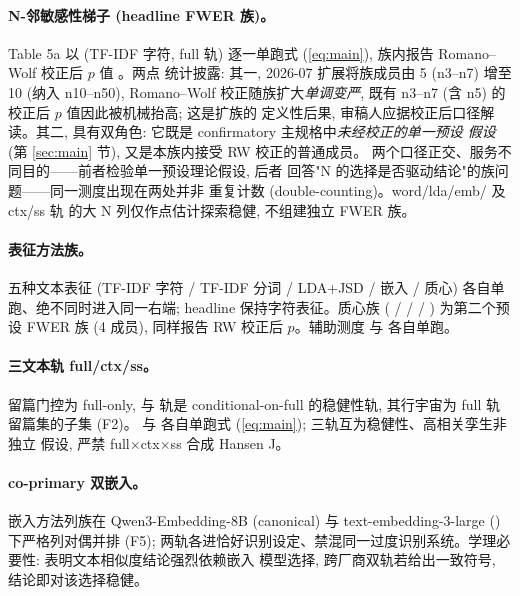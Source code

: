 \paragraph{N-邻敏感性梯子 (headline FWER 族)。}
Table 5a 以 
(TF-IDF 字符, full 轨) 逐一单跑式 (\ref{eq:main}), 族内报告
Romano--Wolf 校正后 $p$ 值 \parencite{romano2005stepwise}。两点
统计披露: 其一, 2026-07 扩展将族成员由 5 (n3--n7) 增至 10
(纳入 n10--n50), Romano--Wolf 校正随族扩大\emph{单调变严},
既有 n3--n7 (含 n5) 的校正后 $p$ 值因此被机械抬高; 这是扩族的
定义性后果, 审稿人应据校正后口径解读。其二, 
具有双角色: 它既是 confirmatory 主规格中\emph{未经校正的单一预设
假设} (第 \ref{sec:main} 节), 又是本族内接受 RW 校正的普通成员。
两个口径正交、服务不同目的——前者检验单一预设理论假设, 后者
回答"N 的选择是否驱动结论"的族问题——同一测度出现在两处并非
重复计数 (double-counting)。word/lda/emb/ 及 ctx/ss 轨
的大 N 列仅作点估计探索稳健, 不组建独立 FWER 族。

\paragraph{表征方法族。}
五种文本表征 (TF-IDF 字符 / TF-IDF 分词 / LDA+JSD / 嵌入 / 质心)
各自单跑、绝不同时进入同一右端; headline 保持字符表征。质心族
( /  /
 / ) 为第二个预设
FWER 族 (4 成员), 同样报告 RW 校正后 $p$。辅助测度
 与  各自单跑。

\paragraph{三文本轨 full/ctx/ss。}
留篇门控为 full-only,  与  轨是
conditional-on-full 的稳健性轨, 其行宇宙为 full 轨留篇集的子集
(F2)。 与 
各自单跑式 (\ref{eq:main}); 三轨互为稳健性、高相关孪生非独立
假设, 严禁 full$\times$ctx$\times$ss 合成 Hansen J。

\paragraph{co-primary 双嵌入。}
嵌入方法列族在 Qwen3-Embedding-8B (canonical) 与
text-embedding-3-large () 下严格列对偶并排 (F5);
两轨各进恰好识别设定、禁混同一过度识别系统。学理必要性:
\textcite{ganguli2024patenttext} 表明文本相似度结论强烈依赖嵌入
模型选择, 跨厂商双轨若给出一致符号, 结论即对该选择稳健。

